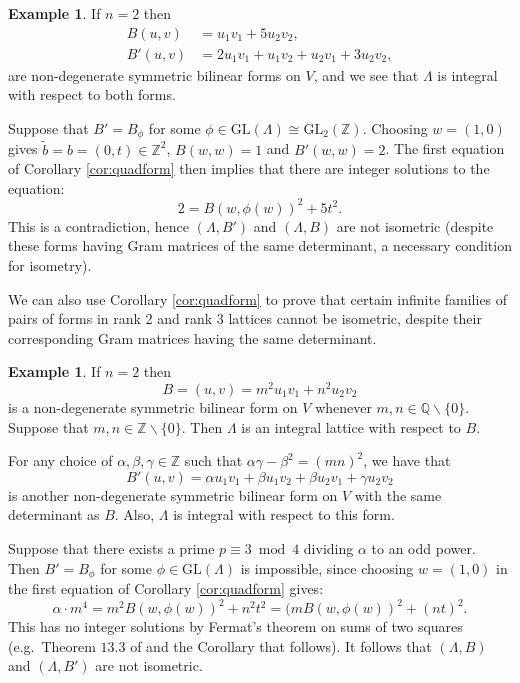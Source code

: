 \documentclass{amsart}
\theoremstyle{plain}
\theoremstyle{definition}
\newtheorem{eg}[theorem]{Example}
\begin{document}
\begin{eg}
\label{eg:rank2}
If $n=2$ then \begin{align*}B(u,v) &= u_1v_1 + 5u_2v_2,\\ B'(u,v) &= 2u_1v_1 + u_1v_2 + u_2v_1 + 3u_2v_2,\end{align*} are non-degenerate symmetric bilinear forms on $V$, and we see that $\Lambda$ is integral with respect to both forms. 

Suppose that $B' = B_{\phi}$ for some $\phi\in\text{GL}(\Lambda) \cong \text{GL}_2(\mathbb{Z})$. Choosing $w = (1,0)$ gives $\tilde{b} = b = (0,t)\in\mathbb{Z}^2$, $B(w,w) = 1$ and $B'(w,w) = 2$. The first equation of Corollary \ref{cor:quadform} then implies that there are integer solutions to the equation: \[2 = B(w,\phi(w))^2 + 5t^2.\] This is a contradiction, hence $(\Lambda,B')$ and $(\Lambda,B)$ are not isometric (despite these forms having Gram matrices of the same determinant, a necessary condition for isometry). 
\end{eg}

We can also use Corollary \ref{cor:quadform} to prove that certain infinite families of pairs of forms in rank 2 and rank 3 lattices cannot be isometric, despite their corresponding Gram matrices having the same determinant.

\begin{eg}
\label{eg:rank2gen}
If $n=2$ then \[B=(u,v) = m^2u_1v_1 + n^2u_2v_2\] is a non-degenerate symmetric bilinear form on $V$ whenever $m,n\in\mathbb{Q}\backslash\{0\}$. Suppose that $m,n\in\mathbb{Z}\backslash\{0\}$. Then $\Lambda$ is an integral lattice with respect to $B$. 

For any choice of $\alpha,\beta,\gamma\in\mathbb{Z}$ such that $\alpha\gamma - \beta^2 = (mn)^2$, we have that \[B'(u,v) = \alpha u_1v_1 + \beta u_1v_2 + \beta u_2v_1 + \gamma u_2v_2\] is another non-degenerate symmetric bilinear form on $V$ with the same determinant as $B$. Also, $\Lambda$ is integral with respect to this form.

Suppose that there exists a prime $p\equiv 3 \bmod 4$ dividing $\alpha$ to an odd power. Then $B' = B_{\phi}$ for some $\phi\in\text{GL}(\Lambda)$ is impossible, since choosing $w = (1,0)$ in the first equation of Corollary \ref{cor:quadform} gives: \[\alpha\cdot m^4 = m^2B(w,\phi(w))^2 + n^2t^2 = (mB(w,\phi(w))^2 + (nt)^2.\] This has no integer solutions by Fermat's theorem on sums of two squares (e.g.\ Theorem $13.3$ of \cite{burton} and the Corollary that follows). It follows that $(\Lambda, B)$ and $(\Lambda,B')$ are not isometric.
\end{eg}
\end{document}
